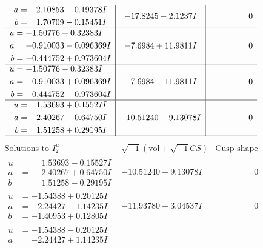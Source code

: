 \documentclass[1p]{elsarticle_modified}
\theoremstyle{definition}
\newcommand{\I}{\sqrt{-1}}
\begin{document}
$$\begin{array}{c|c|c}
\begin{aligned}
a &= \phantom{-}2.10853 - 0.19378 I \\
b &= \phantom{-}1.70709 - 0.15451 I\end{aligned}
 & -17.8245 - 2.1237 I & \phantom{-0.000000 } 0 \\ \hline\begin{aligned}
u &= -1.50776 + 0.32383 I \\
a &= -0.910033 - 0.096369 I \\
b &= -0.444752 + 0.973604 I\end{aligned}
 & -7.6984 + 11.9811 I & \phantom{-0.000000 } 0 \\ \hline\begin{aligned}
u &= -1.50776 - 0.32383 I \\
a &= -0.910033 + 0.096369 I \\
b &= -0.444752 - 0.973604 I\end{aligned}
 & -7.6984 - 11.9811 I & \phantom{-0.000000 } 0 \\ \hline\begin{aligned}
u &= \phantom{-}1.53693 + 0.15527 I \\
a &= \phantom{-}2.40267 - 0.64750 I \\
b &= \phantom{-}1.51258 + 0.29195 I\end{aligned}
 & -10.51240 - 9.13078 I & \phantom{-0.000000 } 0\\
 \hline 
 \end{array}$$\newpage$$\begin{array}{c|c|c}  
\text{Solutions to }I^u_{2}& \I (\text{vol} + \sqrt{-1}CS) & \text{Cusp shape}\\
 \hline 
\begin{aligned}
u &= \phantom{-}1.53693 - 0.15527 I \\
a &= \phantom{-}2.40267 + 0.64750 I \\
b &= \phantom{-}1.51258 - 0.29195 I\end{aligned}
 & -10.51240 + 9.13078 I & \phantom{-0.000000 } 0 \\ \hline\begin{aligned}
u &= -1.54388 + 0.20125 I \\
a &= -2.24427 - 1.14235 I \\
b &= -1.40953 + 0.12805 I\end{aligned}
 & -11.93780 + 3.04537 I & \phantom{-0.000000 } 0 \\ \hline\begin{aligned}
u &= -1.54388 - 0.20125 I \\
a &= -2.24427 + 1.14235 I \\

\end{aligned}
\end{array}$$
\end{document}
